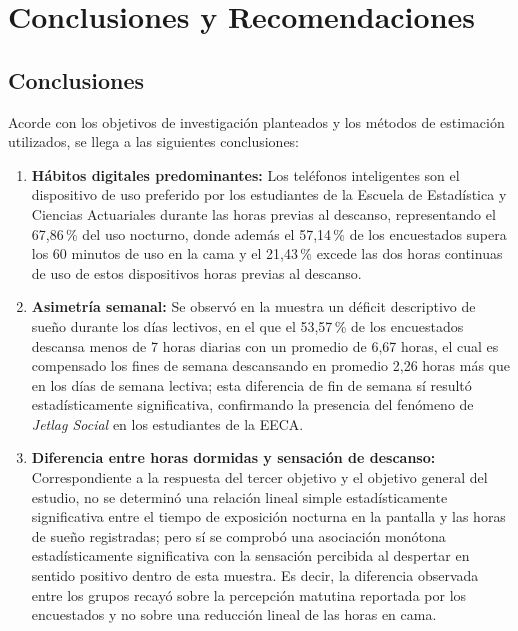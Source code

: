 \documentclass[12pt, letterpaper]{article}
\begin{document}
\section{Conclusiones y Recomendaciones}

\subsection{Conclusiones}

Acorde con los objetivos de investigación planteados y los métodos de estimación utilizados, se llega a las siguientes conclusiones:

\begin{enumerate}
    \item \textbf{Hábitos digitales predominantes:} Los teléfonos inteligentes son el dispositivo de uso preferido por los estudiantes de la Escuela de Estadística y Ciencias Actuariales durante las horas previas al descanso, representando el 67,86\,\% del uso nocturno, donde además el 57,14\,\% de los encuestados supera los 60 minutos de uso en la cama y el 21,43\,\% excede las dos horas continuas de uso de estos dispositivos horas previas al descanso.

    \item \textbf{Asimetría semanal:} Se observó en la muestra un déficit descriptivo de sueño durante los días lectivos, en el que el 53,57\,\% de los encuestados descansa menos de 7 horas diarias con un promedio de 6,67 horas, el cual es compensado los fines de semana descansando en promedio 2,26 horas más que en los días de semana lectiva; esta diferencia de fin de semana sí resultó estadísticamente significativa, confirmando la presencia del fenómeno de \textit{Jetlag Social} en los estudiantes de la EECA.

    \item \textbf{Diferencia entre horas dormidas y sensación de descanso:} Correspondiente a la respuesta del tercer objetivo y el objetivo general del estudio, no se determinó una relación lineal simple estadísticamente significativa entre el tiempo de exposición nocturna en la pantalla y las horas de sueño registradas; pero sí se comprobó una asociación monótona estadísticamente significativa con la sensación percibida al despertar en sentido positivo dentro de esta muestra. Es decir, la diferencia observada entre los grupos recayó sobre la percepción matutina reportada por los encuestados y no sobre una reducción lineal de las horas en cama.
\end{enumerate}
\end{document}
